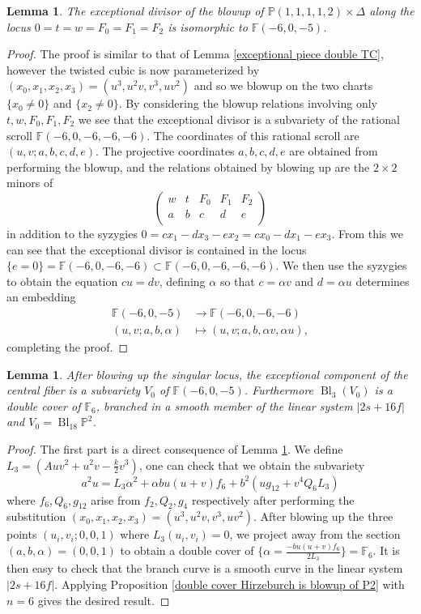\documentclass[a4paper]{amsart}
\theoremstyle{definition}
\theoremstyle{plain}
\newtheorem{lemma}[defn]{Lemma}
\theoremstyle{remark}
\newcommand{\PS}{\mathbb{P}}
\newcommand{\F}{\mathbb{F}}
\begin{document}
\begin{lemma}\label{blowup D17 total space}
The exceptional divisor of the blowup of $\PS(1,1,1,1,2) \times \Delta$ along the locus $0=t=w=F_0=F_1=F_2$ is isomorphic to $\F(-6,0,-5)$.
\end{lemma}

\begin{proof}
The proof is similar to that of Lemma \ref{exceptional piece double TC}, however the twisted cubic is now parameterized by $(x_0,x_1,x_2,x_3)=(u^3,u^2v,v^3,uv^2)$ and so we blowup on the two charts $\{x_0\neq 0\}$ and $\{ x_2\neq 0\}$. By considering the blowup relations involving only $t,w,F_0,F_1,F_2$ we see that the exceptional divisor is a subvariety of the rational scroll $\F(-6,0,-6,-6,-6)$. The coordinates of this rational scroll are $(u,v;a,b,c,d,e)$. The projective coordinates $a,b,c,d,e$ are obtained from performing the blowup, and the relations obtained by blowing up are the $2\times2$ minors of
$$
\begin{pmatrix}
    w & t & F_0 & F_1 & F_2\\
    a & b & c & d & e\\
\end{pmatrix}$$
in addition to the syzygies $0=cx_1-dx_3-ex_2=cx_0-dx_1-ex_3$. From this we can see that the exceptional divisor is contained in the locus $\{e=0\} = \F(-6,0,-6,-6)\subset\F(-6,0,-6,-6,-6)$. We then use the syzygies to obtain the equation $cu=dv$, defining $\alpha$ so that $c = \alpha v$ and $d=\alpha u$ determines an embedding 
\begin{align*}
    \F(-6,0,-5) &\rightarrow \F(-6,0,-6,-6)\\
    (u,v;a,b,\alpha) &\mapsto (u,v;a,b,\alpha v,\alpha u),
\end{align*}
completing the proof.
\end{proof}

\begin{lemma}\label{lemma: blow up hyperelliptic case}
After blowing up the singular locus, the  exceptional component of the central fiber is a subvariety $V_0$ of $\F(-6,0,-5)$. Furthermore $\operatorname{Bl}_3(V_0)$ is a double cover of $\mathbb{F}_6$, branched in a smooth member of the linear system $|2s+16f|$ and $V_0=\operatorname{Bl}_{18}\PS^2$.
\end{lemma}

\begin{proof}
The first part is a direct consequence of Lemma \ref{blowup D17 total space}. We define $L_3 = \left(Auv^2+u^2v-\frac{k}{2}v^3\right)$, one can check that we obtain the subvariety
$$a^2u =L_3\alpha^2+\alpha bu(u+v)f_6+b^2(ug_{12}+v^4Q_6L_3)$$
where $f_6, Q_6, g_{12}$ arise from $f_2,Q_2,g_{4}$ respectively after performing the substitution $(x_0,x_1,x_2,x_3)=(u^3,u^2v,v^3,uv^2)$. After blowing up the three points $(u_i,v_i;0,0,1)$ where $L_3(u_i,v_i)=0$, we project away from the section $(a,b,\alpha)=(0,0,1)$ to obtain a double cover of $\{\alpha = \frac{-bu(u+v)f_6}{2L_3} \} =\F_6$. It is then easy to check that the branch curve is a smooth curve in the linear system $|2s+16f|$. Applying Proposition \ref{double cover Hirzeburch is blowup of P2} with $n=6$ gives the desired result.
\end{proof}
\end{document}
